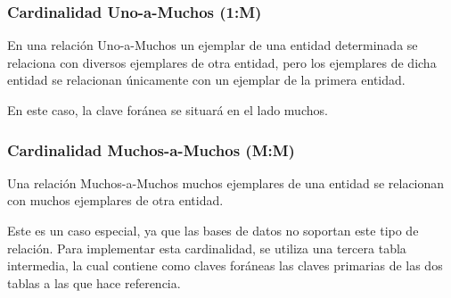\subsubsection{Cardinalidad Uno-a-Muchos (1:M)}
En una relación Uno-a-Muchos un ejemplar de una entidad determinada se relaciona con diversos ejemplares de otra entidad, pero los ejemplares de dicha entidad se relacionan únicamente con un ejemplar de la primera entidad.

En este caso, la clave foránea se situará en el lado muchos.

\subsubsection{Cardinalidad Muchos-a-Muchos (M:M)}
Una relación Muchos-a-Muchos muchos ejemplares de una entidad se relacionan con muchos ejemplares de otra entidad.

Este es un caso especial, ya que las bases de datos no soportan este tipo de relación. Para implementar esta cardinalidad, se utiliza una tercera tabla intermedia, la cual contiene como claves foráneas las claves primarias de las dos tablas a las que hace referencia.
